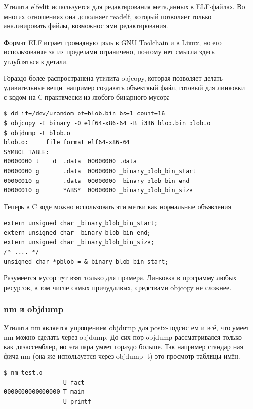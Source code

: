 \documentclass[a4paper,12pt,oneside]{article}
\begin{document}
Утилита elfedit используется для редактирования метаданных в ELF-файлах. Во многих отношениях она дополняет readelf, который позволяет только анализировать файлы, возможностями редактирования.

Формат ELF играет громадную роль в GNU Toolchain и в Linux, но его использование за их пределами ограничено, поэтому нет смысла здесь углубляться в детали.

Гораздо более распространена утилита objcopy, которая позволяет делать удивительные вещи: например создавать объектный файл, готовый для линковки с кодом на C практически из любого бинарного мусора

\begin{verbatim}
$ dd if=/dev/urandom of=blob.bin bs=1 count=16
$ objcopy -I binary -O elf64-x86-64 -B i386 blob.bin blob.o
$ objdump -t blob.o
blob.o:     file format elf64-x86-64
SYMBOL TABLE:
00000000 l    d  .data	00000000 .data
00000000 g       .data	00000000 _binary_blob_bin_start
00000010 g       .data	00000000 _binary_blob_bin_end
00000010 g       *ABS*	00000000 _binary_blob_bin_size
\end{verbatim}

Теперь в C коде можно использовать эти метки как нормальные объявления

\begin{lstlisting}
extern unsigned char _binary_blob_bin_start;
extern unsigned char _binary_blob_bin_end;
extern unsigned char _binary_blob_bin_size;
/* .... */
unsigned char *pblob = &_binary_blob_bin_start;
\end{lstlisting}

Разумеется мусор тут взят только для примера. Линковка в программу любых ресурсов, в том числе самых причудливых, средствами objcopy не сложнее.

\subsubsection{nm и objdump}

Утилита nm является упрощением objdump для posix-подсистем и всё, что умеет nm можно сделать через objdump. До сих пор objdump рассматривался только как дизассемблер, но эта пара умеет гораздо больше. Так например стандартная фича nm (она же используется через objdump -t) это просмотр таблицы имён.

\begin{verbatim}
$ nm test.o
                 U fact
0000000000000000 T main
                 U printf
\end{verbatim}
\end{document}
